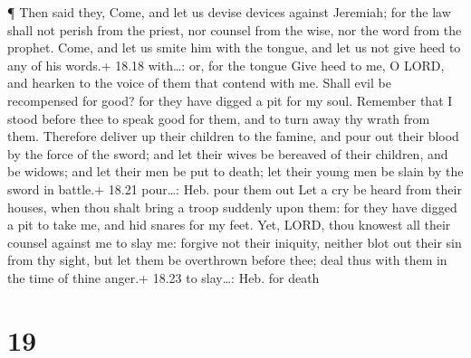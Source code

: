  ¶ Then said they, Come, and let us devise devices against
Jeremiah; for the law shall not perish from the priest, nor counsel from
the wise, nor the word from the prophet. Come, and let us smite him with
the tongue, and let us not give heed to any of his words.+ 18.18
with\ldots: or, for the tongue  Give heed to me, O LORD,
and hearken to the voice of them that contend with me. 
Shall evil be recompensed for good? for they have digged a pit for my
soul. Remember that I stood before thee to speak good for them, and to
turn away thy wrath from them.  Therefore deliver up their
children to the famine, and pour out their blood by the force of the
sword; and let their wives be bereaved of their children, and be widows;
and let their men be put to death; let their young men be slain by the
sword in battle.+ 18.21 pour\ldots: Heb. pour them out  Let
a cry be heard from their houses, when thou shalt bring a troop suddenly
upon them: for they have digged a pit to take me, and hid snares for my
feet.  Yet, LORD, thou knowest all their counsel against me
to slay me: forgive not their iniquity, neither blot out their sin from
thy sight, but let them be overthrown before thee; deal thus with them
in the time of thine anger.+ 18.23 to slay\ldots: Heb. for death

\hypertarget{section-18}{%
\section{19}\label{section-18}}

